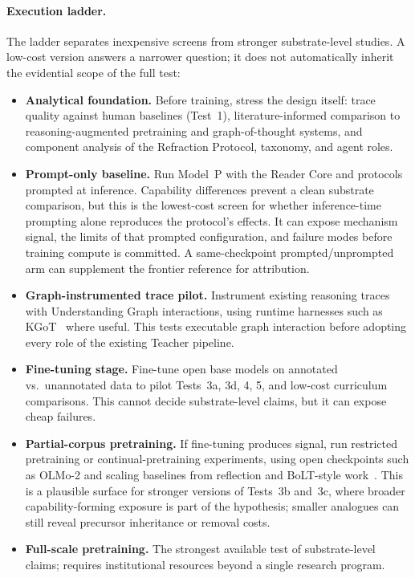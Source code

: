 \paragraph{Execution ladder.} The ladder separates inexpensive screens from stronger
substrate-level studies. A low-cost version answers a narrower question; it
does not automatically inherit the evidential scope of the full test:
\begin{itemize}
    \item \textbf{Analytical foundation.} Before training, stress the design
    itself: trace quality against human baselines (Test~1), literature-informed
    comparison to reasoning-augmented pretraining and graph-of-thought systems,
    and component analysis of the Refraction Protocol, taxonomy, and agent
    roles.
    \item \textbf{Prompt-only baseline.} Run Model~P with the Reader Core and
    protocols prompted at inference. Capability differences prevent a clean
    substrate comparison, but this is the lowest-cost screen for whether
    inference-time prompting alone reproduces the protocol's effects. It can
    expose mechanism signal, the limits of that prompted configuration, and
    failure modes before training compute is committed. A same-checkpoint prompted/unprompted arm can supplement the frontier
    reference for attribution.
    \item \textbf{Graph-instrumented trace pilot.} Instrument existing
    reasoning traces with Understanding Graph interactions, using runtime
    harnesses such as KGoT~\cite{besta2025kgot} where useful. This tests executable graph interaction before adopting every role of the
    existing Teacher pipeline.
    \item \textbf{Fine-tuning stage.} Fine-tune open base models on annotated
    vs.\ unannotated data to pilot Tests~3a, 3d, 4, 5, and low-cost curriculum
    comparisons. This cannot decide substrate-level claims, but it can expose
    cheap failures.
    \item \textbf{Partial-corpus pretraining.} If fine-tuning produces signal,
    run restricted pretraining or continual-pretraining experiments, using
    open checkpoints such as OLMo-2 and scaling baselines from reflection and
    BoLT-style work~\cite{rethinkingreflection2025,ruan2025bolt}. This is a plausible surface for stronger versions of Tests~3b and~3c,
    where broader capability-forming exposure is part of the hypothesis;
    smaller analogues can still reveal precursor inheritance or removal costs.
    \item \textbf{Full-scale pretraining.} The strongest available test of substrate-level claims; requires institutional resources beyond a single research program.
\end{itemize}

